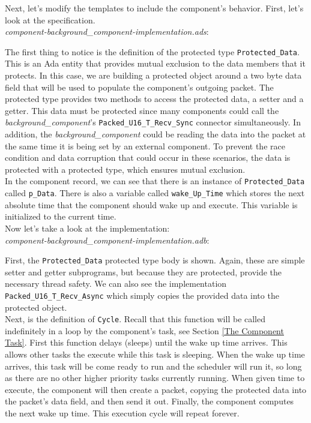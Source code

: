 Next, let's modify the templates to include the component's behavior. First, let's look at the specification. \\

\textit{component-background\_component-implementation.ads}:

The first thing to notice is the definition of the protected type \texttt{Protected\_Data}. This is an Ada entity that provides mutual exclusion to the data members that it protects. In this case, we are building a protected object around a two byte data field that will be used to populate the component's outgoing packet. The protected type provides two methods to access the protected data, a setter and a getter. This data must be protected since many components could call the \textit{background\_component}'s \texttt{Packed\_U16\_T\_Recv\_Sync} connector simultaneously. In addition, the \textit{background\_component} could be reading the data into the packet at the same time it is being set by an external component. To prevent the race condition and data corruption that could occur in these scenarios, the data is protected with a protected type, which ensures mutual exclusion. \\

In the component record, we can see that there is an instance of \texttt{Protected\_Data} called \texttt{p\_Data}. There is also a variable called \texttt{wake\_Up\_Time} which stores the next absolute time that the component should wake up and execute. This variable is initialized to the current time. \\

Now let's take a look at the implementation: \\

\textit{component-background\_component-implementation.adb}:

First, the \texttt{Protected\_Data} protected type body is shown. Again, these are simple setter and getter subprograms, but because they are protected, provide the necessary thread safety. We can also see the implementation \texttt{Packed\_U16\_T\_Recv\_Async} which simply copies the provided data into the protected object. \\

Next, is the definition of \texttt{Cycle}. Recall that this function will be called indefinitely in a loop by the component's task, see Section \ref{The Component Task}. First this function delays (sleeps) until the wake up time arrives. This allows other tasks the execute while this task is sleeping. When the wake up time arrives, this task will be come ready to run and the scheduler will run it, so long as there are no other higher priority tasks currently running. When given time to execute, the component will then create a packet, copying the protected data into the packet's data field, and then send it out. Finally, the component computes the next wake up time. This execution cycle will repeat forever. \\

